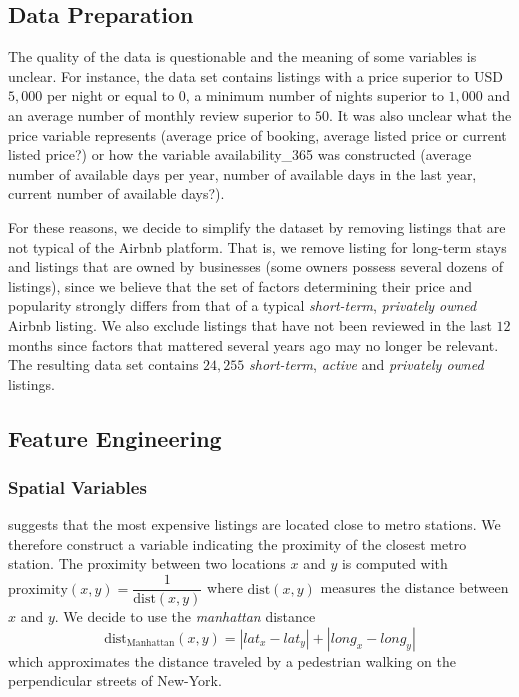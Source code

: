 \documentclass[10pt]{jmlr}%
\begin{document}
\subsection{Data Preparation}
\label{sec:data}
The quality of the data is questionable and the meaning of some variables is unclear. For instance, the data set contains listings with a price superior to USD$5,000$ per night or equal to $0$, a minimum number of nights superior to $1,000$ and an average number of monthly review superior to $50$. It was also unclear what the price variable represents (average price of booking, average listed price or current listed price?) or how the variable availability\_365 was constructed (average number of available days per year, number of available days in the last year, current number of available days?).

For these reasons, we decide to simplify the dataset by removing listings that are not typical of the Airbnb platform. That is, we remove listing for long-term stays and listings that are owned by businesses (some owners possess several dozens of listings), since we believe that the set of factors determining their price and popularity strongly differs from that of a typical \textit{short-term}, \textit{privately owned} Airbnb listing. We also exclude listings that have not been reviewed in the last $12$ months since factors that mattered several years ago may no longer be relevant. The resulting data set contains $24,255$ \textit{short-term}, \textit{active} and \textit{privately owned} listings.

\subsection{Feature Engineering}
\label{sec:feature}
\subsubsection{Spatial Variables}
 suggests that the most expensive listings are located close to metro stations. We therefore construct a variable indicating the proximity of the closest metro station. The proximity between two locations $x$ and $y$ is computed with
$\text{proximity}(x,y) = \dfrac{1}{\text{dist}(x,y)}$
where $\text{dist}(x,y)$ measures the distance between $x$ and $y$. We decide to use the \textit{manhattan} distance
$$\text{dist}_{\text{Manhattan}}(x,y) = |lat_x - lat_y| + |long_x - long_y|$$
which approximates the distance traveled by a pedestrian walking on the perpendicular streets of New-York.
\end{document}
